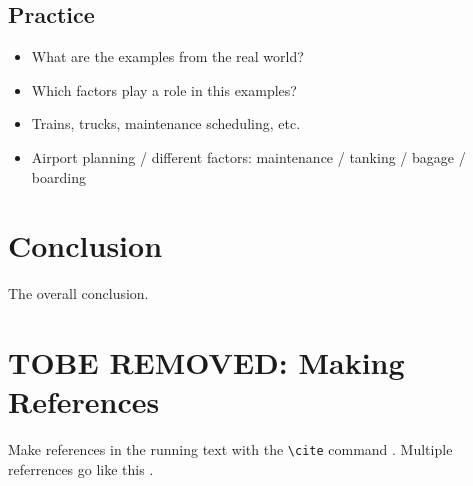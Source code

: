 \documentclass{article}
\begin{document}
\subsection{Practice}

\begin{itemize}
\item What are the examples from the real world?
\item Which factors play a role in this examples?
\item Trains, trucks, maintenance scheduling, etc.
\item Airport planning / different factors: maintenance / tanking / bagage / boarding
\end{itemize}

\section{Conclusion}

The overall conclusion.


\section{TOBE REMOVED: Making References}

  Make references in the running text with the \verb+\cite+
  command \cite{dijkstra68}. Multiple referrences go like this
  \cite{charniak85,steels98}.




\end{document}
